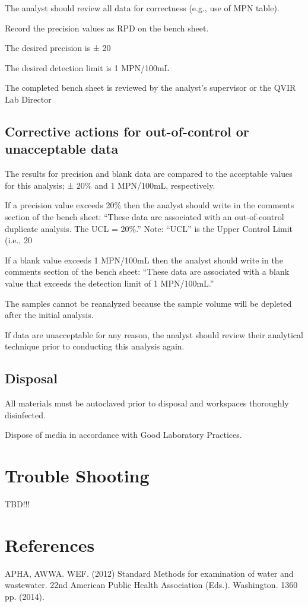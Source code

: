 \documentclass[12pt]{../SOP4_alpha}\usepackage[]{graphicx}\usepackage[]{xcolor}
\begin{document}
\NP The analyst should review all data for correctness (e.g., use of MPN table).


\NP Record the precision values as RPD on the bench sheet.

\NP The desired precision is ± 20%

\NP The desired detection limit is 1 MPN/100mL

\NP The completed bench sheet is reviewed by the analyst's supervisor or the
QVIR Lab Director 


\subsection{Corrective actions for out-of-control or unacceptable data}

\NP The results for precision and blank data are compared to the
acceptable values for this analysis; ± 20\% and 1 MPN/100mL,
respectively.

\NP If a precision value exceeds 20\% then the analyst should write in the
comments section of the bench sheet: “These data are associated
with an out-of-control duplicate analysis. The UCL = 20\%.” Note:
“UCL” is the Upper Control Limit (i.e., 20%

\NP If a blank value exceeds 1 MPN/100mL then the analyst should write
in the comments section of the bench sheet: “These data are
associated with a blank value that exceeds the detection limit of 1
MPN/100mL.”

\NP The samples cannot be reanalyzed because the sample volume will be
depleted after the initial analysis.

\NP  If data are unacceptable for any reason, the analyst should review
their analytical technique prior to conducting this analysis again. 

\subsection{Disposal}


\NP All materials must be autoclaved prior to disposal and workspaces
thoroughly disinfected.

\NP Dispose of media in accordance with Good Laboratory Practices.

\section{Trouble Shooting}

TBD!!! 


\section{References}

\NP APHA, AWWA. WEF. (2012) Standard Methods for examination of water and wastewater. 22nd American Public Health Association (Eds.). Washington. 1360 pp. (2014).

\appendix



\end{document}
